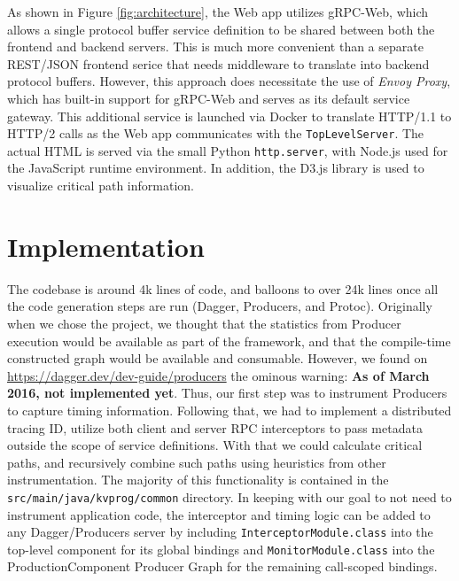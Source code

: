 \documentclass[11pt, twoside, twocolumn]{extarticle}
\begin{document}
As shown in Figure \ref{fig:architecture}, the Web app utilizes gRPC-Web, which allows a single protocol buffer service definition to be shared between both the frontend and backend servers.  This is much more convenient than a separate REST/JSON frontend serice that needs middleware to translate into backend protocol buffers.  However, this approach does necessitate the use of \textit{Envoy Proxy}\cite{envoyproxy}, which has built-in support for gRPC-Web and serves as its default service gateway.  This additional service is launched via Docker to translate HTTP/1.1 to HTTP/2 calls as the Web app communicates with the \lstinline{TopLevelServer}.  The actual HTML is served via the small Python \lstinline{http.server}, with Node.js\cite{Nodejs} used for the JavaScript runtime environment.  In addition, the D3.js library\cite{d3js} is used to visualize critical path information.

\section{Implementation}

The codebase is around 4k lines of code, and balloons to over 24k lines once all the code generation steps are run (Dagger, Producers, and Protoc). Originally when we chose the project, we thought that the statistics from Producer execution would be available as part of the framework, and that the compile-time constructed graph would be available and consumable.  However, we found on \url{https://dagger.dev/dev-guide/producers} the ominous warning: \textbf{As of March 2016, not implemented yet}. Thus, our first step was to instrument Producers to capture timing information.  Following that, we had to implement a distributed tracing ID, utilize both client and server RPC interceptors to pass metadata outside the scope of service definitions.  With that we could calculate critical paths, and recursively combine such paths using heuristics from other instrumentation.  The majority of this functionality is contained in the \lstinline{src/main/java/kvprog/common} directory.  In keeping with our goal to not need to instrument application code, the interceptor and timing logic can be added to any Dagger/Producers server by including \lstinline{InterceptorModule.class} into the top-level component for its global bindings and \lstinline{MonitorModule.class} into the ProductionComponent Producer Graph for the remaining call-scoped bindings.
\end{document}
